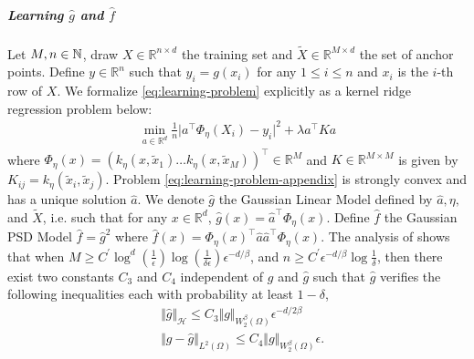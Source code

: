 \subparagraph{Learning $\hat g$ and $\hat f$} Let $M, n \in \mathbb N$, draw $X\in\mathbb R^{n \times d}$ the training set and $\tilde X \in \mathbb R^{M \times d}$ the set of anchor points. Define $y \in \mathbb R^n$ such that $y_i = g(x_i)$ for any $1 \leq i \leq n$ and $x_i$ is the $i$-th row of $X$.
%
We formalize \cref{eq:learning-problem} explicitly as a kernel ridge regression problem below:
%
\begin{align}\label{eq:learning-problem-appendix}
    \min_{a\in\mathbb R^d} \frac{1}{n} \vert a^\top \Phi_{\eta}(X_i) - y_i\vert^2 + \lambda a^\top K a
\end{align}
%
where $\Phi_\eta(x) = (k_\eta(x, \tilde x_1) \dots k_\eta(x, \tilde x_M))^\top \in\mathbb R^M$ and $K\in\mathbb R^{M\times M}$ is given by $K_{ij}=k_\eta(\tilde x_i, \tilde x_j)$.
%
Problem \cref{eq:learning-problem-appendix} is strongly convex and has a unique solution $\hat a$.
%
We denote $\hat g$ the Gaussian Linear Model defined by $\hat a, \eta,$ and $\tilde X$, i.e. such that for any $x \in\mathbb R^d$, $\hat g(x) = \hat a^\top \Phi_\eta(x)$. Define $\hat f$ the Gaussian PSD Model $\hat f= \hat g^2$ where $\hat f(x) = \Phi_\eta(x)^\top \hat a\hat a^\top \Phi_\eta(x)$.
%
The analysis of \cite{sampling-ulysse} shows that when $M \geq C^\prime \log^d(\frac{1}{\epsilon})\log(\frac{1}{\delta\epsilon})\epsilon^{-d/\beta}$, and $n \geq C^\prime \epsilon^{-d/\beta}\log \frac{1}{\delta}$, then there exist two constants $C_3$ and $C_4$ independent of $g$ and $\hat g$ such that $\hat g$ verifies the following inequalities each with probability at least $1-\delta$,
\begin{align}
   &\Vert \hat g\Vert_\mathcal H\leq C_3\Vert g\Vert_{W^\beta_2(\Omega)}\epsilon^{-d/2\beta}\label{eq:hat-g}\\
    &\Vert g - \hat g\Vert_{L^2(\Omega)} \leq C_4 \Vert g\Vert_{W^\beta_2(\Omega)}\epsilon.\label{eq:g-hat-g}
\end{align}


